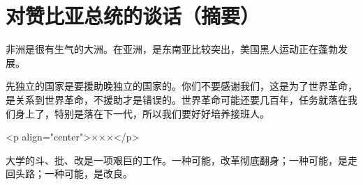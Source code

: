 \section[对赞比亚总统的谈话（摘要）（一九六七年六月）]{对赞比亚总统的谈话（摘要）}


非洲是很有生气的大洲。在亚洲，是东南亚比较突出，美国黑人运动正在蓬勃发展。

先独立的国家是要援助晚独立的国家的。你们不要感谢我们，这是为了世界革命，是关系到世界革命，不援助才是错误的。世界革命可能还要几百年，任务就落在我们身上了，特别是落在下一代，所以我们要好好培养接班人。

<p align="center">×××</p>

大学的斗、批、改是一项艰巨的工作。一种可能，改革彻底翻身；一种可能，是走回头路；一种可能，是改良。

